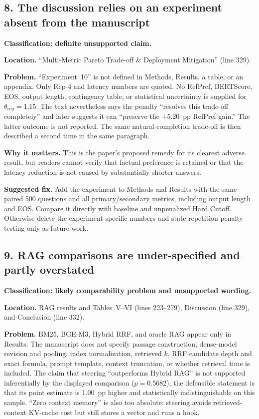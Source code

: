 \documentclass[11pt]{article}
\newcommand{\status}[1]{\textbf{#1}}
\begin{document}
\subsection*{8. The discussion relies on an experiment absent from the manuscript}

\status{Classification: definite unsupported claim.}

\status{Location.} ``Multi-Metric Pareto Trade-off \& Deployment Mitigation'' (line 329).

\status{Problem.} ``Experiment~10'' is not defined in Methods, Results, a table, or an appendix.  Only Rep-4 and latency numbers are quoted.  No RefPref, BERTScore, EOS, output length, contingency table, or statistical uncertainty is supplied for $\theta_{\mathrm{rep}}=1.15$.  The text nevertheless says the penalty ``resolves this trade-off completely'' and later suggests it can ``preserve the +5.20~pp RefPref gain.''  The latter outcome is not reported.  The same natural-completion trade-off is then described a second time in the same paragraph.

\status{Why it matters.} This is the paper's proposed remedy for its clearest adverse result, but readers cannot verify that factual preference is retained or that the latency reduction is not caused by substantially shorter answers.

\status{Suggested fix.} Add the experiment to Methods and Results with the same paired 500 questions and all primary/secondary metrics, including output length and EOS.  Compare it directly with baseline and unpenalized Hard Cutoff.  Otherwise delete the experiment-specific numbers and state repetition-penalty testing only as future work.

\subsection*{9. RAG comparisons are under-specified and partly overstated}

\status{Classification: likely comparability problem and unsupported wording.}

\status{Location.} RAG results and Tables~V--VI (lines 223--279), Discussion (line 329), and Conclusion (line 332).

\status{Problem.} BM25, BGE-M3, Hybrid RRF, and oracle RAG appear only in Results.  The manuscript does not specify passage construction, dense-model revision and pooling, index normalization, retrieved $k$, RRF candidate depth and exact formula, prompt template, context truncation, or whether retrieval time is included.  The claim that steering ``outperforms Hybrid RAG'' is not supported inferentially by the displayed comparison ($p=0.5682$); the defensible statement is that its point estimate is 1.00~pp higher and statistically indistinguishable on this sample.  ``Zero context memory'' is also too absolute: steering avoids retrieved-context KV-cache cost but still stores a vector and runs a hook.
\end{document}
